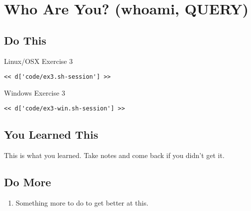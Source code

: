 \chapter{Who Are You? (whoami, QUERY)}

\section{Do This}

\begin{code}{Linux/OSX Exercise 3}
\begin{Verbatim}
<< d['code/ex3.sh-session'] >>
\end{Verbatim}
\end{code}

\begin{code}{Windows Exercise 3}
\begin{Verbatim}
<< d['code/ex3-win.sh-session'] >>
\end{Verbatim}
\end{code}

\section{You Learned This}

This is what you learned.  Take notes and come back if you didn't get it.

\section{Do More}

\begin{enumerate}
\item Something more to do to get better at this.
\end{enumerate}

